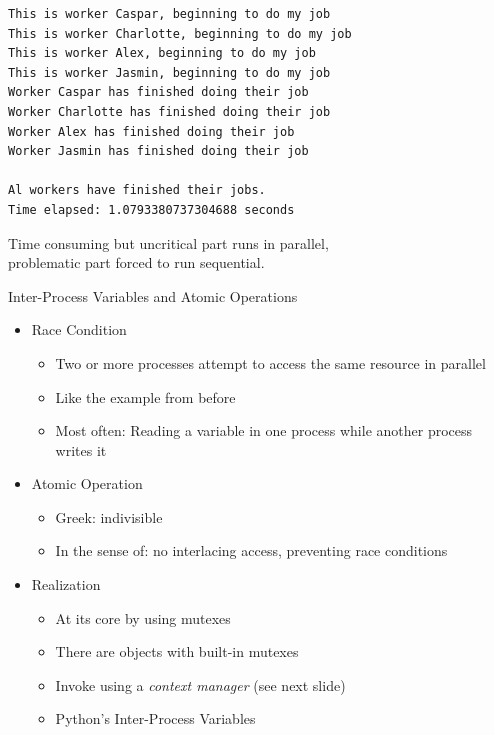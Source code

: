 
\begin{frame}[fragile]
%
\begin{cmdbox}
\begin{verbatim}
This is worker Caspar, beginning to do my job
This is worker Charlotte, beginning to do my job
This is worker Alex, beginning to do my job
This is worker Jasmin, beginning to do my job
Worker Caspar has finished doing their job
Worker Charlotte has finished doing their job
Worker Alex has finished doing their job
Worker Jasmin has finished doing their job

Al workers have finished their jobs.
Time elapsed: 1.0793380737304688 seconds
\end{verbatim}
\end{cmdbox}

\begin{center}
\Thus Time consuming but uncritical part runs in parallel,\\
	problematic part forced to run sequential.
\end{center}
%
\end{frame}


\begin{frame}{Inter-Process Variables and Atomic Operations}
%
\begin{itemize}
\item Race Condition
	\begin{itemize}
	\item Two or more processes attempt to access the same resource in parallel
	\item Like the example from before
	\item Most often: Reading a variable in one process while another process writes it
	\end{itemize}
\item Atomic Operation
	\begin{itemize}
	\item Greek: indivisible
	\item In the sense of: no interlacing access, preventing race conditions
	\end{itemize}
\item Realization
	\begin{itemize}
	\item At its core by using mutexes
	\item There are objects with built-in mutexes
	\item Invoke using a \emph{context manager} (see next slide)
	\item[\Thus] Python's Inter-Process Variables
	\end{itemize}
\end{itemize}
%
\end{frame}

